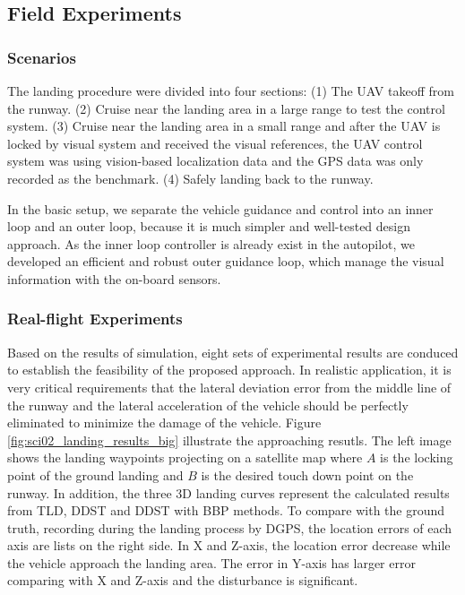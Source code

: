 \documentclass[journal,article,submit,moreauthors,pdftex,10pt,a4paper]{mdpi}
\begin{document}
\subsection{Field Experiments}
\subsubsection{Scenarios}

The landing procedure were divided into four sections: (1) The UAV takeoff from the runway. (2) Cruise near the landing area in a large range to test the control system. (3) Cruise near the landing area in a small range and after the UAV is locked by visual system and received the visual references, the UAV control system was using vision-based localization data and the GPS data was only recorded as the benchmark. (4) Safely landing back to the runway.

In the basic setup, we separate the vehicle guidance and control into an inner loop and an outer loop, because it is much simpler and well-tested design approach. As the inner loop controller is already exist in the autopilot, we developed an efficient and robust outer guidance loop, which manage the visual information with the on-board sensors.




\subsubsection{Real-flight Experiments}
Based on the results of simulation, eight sets of experimental results are conduced to establish the feasibility of the proposed approach. In realistic application, it is very critical requirements that the lateral deviation error from the middle line of the runway and the lateral acceleration of the vehicle should be perfectly eliminated to minimize the damage of the vehicle. Figure \ref{fig:sci02_landing_results_big} illustrate the approaching resutls. The left image shows the landing waypoints projecting on a satellite map where $A$ is the locking point of the ground landing and $B$ is the desired touch down point on the runway. In addition, the three 3D landing curves represent the calculated results from TLD, DDST and DDST with BBP methods. To compare with the ground truth, recording during the landing process by DGPS, the location errors of each axis are lists on the right side. In X and Z-axis, the location error decrease while the vehicle approach the landing area. The error in Y-axis has larger error comparing with X and Z-axis and the disturbance is significant.
\end{document}
